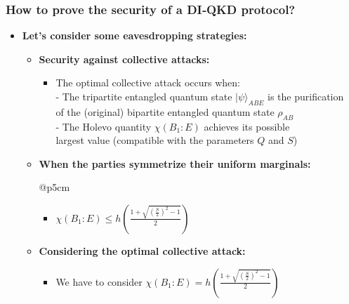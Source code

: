\documentclass{beamer}
\begin{document}
    \begin{frame}
        \frametitle{\large How to prove the security of a DI‑QKD protocol?}

        \vspace{4ex}
        \begin{itemize}
            \item \textbf{Let's consider some eavesdropping strategies:}
            \begin{itemize}
                \item \textbf{Security against collective attacks:}
                \begin{itemize}
                    \item The optimal collective attack occurs when:\\\footnotesize
                    - The tripartite entangled quantum state ${|\psi\rangle}_{ABE}$ is the purification\\\hspace{0.5em}of the (original) bipartite entangled quantum state ${\rho}_{AB}$\\
                    - The Holevo quantity $\chi({B}_{1}:E)$ achieves its possible\\\hspace{0.5em}largest value (compatible with the parameters $Q$ and $S$)
                \end{itemize}
                \item \textbf{When the parties symmetrize their uniform marginals:}
                \begin{blockarray}{@{}p{5cm}}
                    \vspace{-0.9\baselineskip}
                    \begin{itemize}
                        \item $\chi({B}_{1}:E) \leq h\left( \frac{1 + \sqrt{{(\frac{S}{2})}^{2} - 1}}{2} \right)$
                    \end{itemize}
                    \vspace*{-0.9\baselineskip}
                    \vspace*{0.6ex}
                \end{blockarray}
                \vspace{-1ex}
                \item \textbf{Considering the optimal collective attack:}
                \begin{itemize}
                    \item We have to consider $\chi({B}_{1}:E) = h\left( \frac{1 + \sqrt{{(\frac{S}{2})}^{2} - 1}}{2} \right)$\\ \scriptsize

\end{itemize}
\end{itemize}
\end{itemize}
\end{frame}
\end{document}
